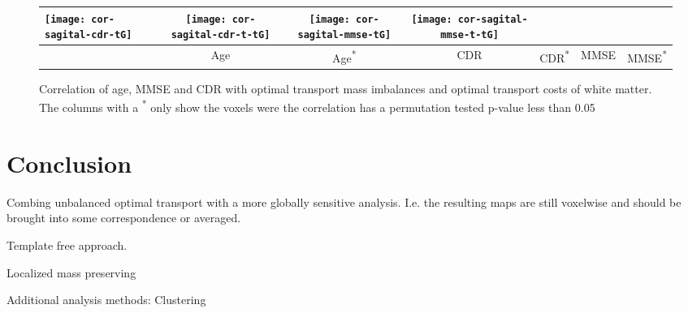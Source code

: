 \documentclass{llncs}
\begin{document}
\begin{figure}[!b]
\begin{tabular}{l|cc|cc|cc}
\texttt{[image: cor-sagital-cdr-tG]} &
\texttt{[image: cor-sagital-cdr-t-tG]} &
\texttt{[image: cor-sagital-mmse-tG]} &
\texttt{[image: cor-sagital-mmse-t-tG]} \\ \hline \hline
& \parbox[b][4mm]{6mm}{Age} 
& \parbox[b][4mm]{6mm}{Age\textsuperscript{*}} 
& \parbox[b][4mm]{6mm}{CDR} 
& \parbox[b][4mm]{6mm}{CDR\textsuperscript{*}}
& \parbox[b][4mm]{6mm}{MMSE}
& \parbox[b][4mm]{6mm}{MMSE\textsuperscript{*}}
\end{tabular}
\caption{\label{fig:cor-oasis-white}
Correlation of age, MMSE and CDR with optimal transport mass imbalances and
optimal transport costs of white matter. The columns with a \textsuperscript{*}
only show the voxels were the correlation has a permutation tested p-value less
than 0.05  }
\end{figure}
\endgroup




\section{Conclusion}
Combing unbalanced optimal transport with a more globally sensitive analysis.
I.e. the resulting maps are still voxelwise and should be brought into some
correspondence or averaged.

Template free approach.

Localized mass preserving

Additional analysis methods: Clustering
\end{document}
